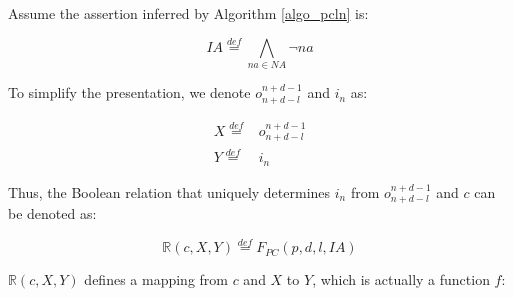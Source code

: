 \documentclass[journal]{IEEEtran}
\begin{document}

%

Assume the assertion inferred by Algorithm \ref{algo_pcln} is:

\begin{equation}\label{equ_fdia}
IA\stackrel{def}{=}\bigwedge_{na\in NA}\neg na
\end{equation}

To simplify the presentation, we denote $o_{n+d-l}^{n+d-1}$ and $i_n$ as:

\begin{equation}\label{equ_fdin}
\begin{split}
X\stackrel{def}{=}& o_{n+d-l}^{n+d-1}\\
Y\stackrel{def}{=}& i_n
\end{split}
\end{equation}

Thus,
the Boolean relation that uniquely determines $i_n$ from $o_{n+d-l}^{n+d-1}$ and $c$ can be denoted as:

\begin{equation}\label{equ_fdR}
\mathbb{R}(c,X,Y)\stackrel{def}{=} F_{PC}(p,d,l,IA)
\end{equation}


$\mathbb{R}(c,X,Y)$ defines a mapping from $c$ and $X$ to $Y$,
which is actually a function $f$:
\end{document}
